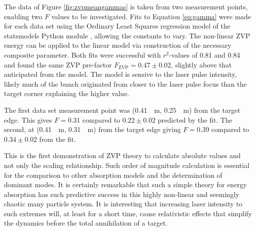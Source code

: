 The data of Figure \ref{fig:zvpmeangammas} is taken from two measurement points, enabling two $F$ values to be investigated. Fits to Equation \ref{eq:gamma} were made for each data set using the Ordinary Least Squares regression model of the statsmodels Python module \cite{seabold2010statsmodels}, allowing the constants to vary. The non-linear ZVP energy can be applied to the linear model via construction of the necessary composite parameter. Both fits were successful with $r^2$-values of 0.81 and 0.84 and found the same ZVP pre-factor $F_\mathrm{ZVP} = 0.47 \pm 0.02$, slightly above that anticipated from the model. The model is sensive to the laser pulse intensity, likely much of the bunch originated from closer to the laser pulse focus than the target corner explaining the higher value.

The first data set measurement point was (\qty{0.41}{\mu m}, \qty{0.25}{\mu m}) from the target edge. This gives $F = 0.31$ compared to $0.22 \pm 0.02$ predicted by the fit. The second, at (\qty{0.41}{\mu m}, \qty{0.31}{\mu m}) from the target edge giving $F = 0.39$ compared to $0.34 \pm 0.02$ from the fit.

This is the first demonstration of ZVP theory to calculate absolute values and not only the scaling relationship. Such order of magnitude calculation is essential for the comparison to other absorption models and the determination of dominant modes. It is certainly remarkable that such a simple theory for energy absorption has such predictive success in this highly non-linear and seemingly chaotic many particle system. It is interesting that increasing laser intensity to such extremes will, at least for a short time, cause relativistic effects that simplify the dynamics before the total annihilation of a target.

